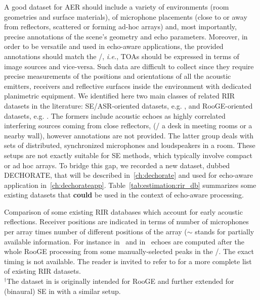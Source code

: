 \mynewline
A good dataset for \ac{AER} should include a variety of environments (room geometries and surface materials), of microphone placements (close to or away from reflectors, scattered or forming ad-hoc arrays) and, most importantly, precise annotations of the scene's geometry and echo parameters.
Moreover, in order to be versatile and used in echo-aware applications, the provided annotations should match the \ISM/, \textit{i.e.}, TOAs should be expressed in terms of image sources and vice-versa.
Such data are difficult to collect since they require precise measurements of the positions and orientations of all the acoustic emitters, receivers and reflective surfaces inside the environment with dedicated planimetric equipment.
We identified here two main classes of related \ac{RIR} datasets in the literature:
\ac{SE}/\ac{ASR}-oriented datasets, e.g. , and \ac{RooGE}-oriented datasets, e.g. .
The formers include acoustic echoes as highly correlated interfering sources coming from close reflectors, (\eg/ a desk in meeting rooms or a nearby wall), however annotations are not provided.
The latter group deals with sets of distributed, synchronized microphones and loudspeakers in a room.
These setups are not exactly suitable for \ac{SE} methods, which typically involve compact or ad hoc arrays.
To bridge this gap, we recorded a new dataset, dubbed \ac{DECHORATE}, that will be described in~\cref{ch:dechorate} and used for echo-aware application in~\cref{ch:dechorateapp}.
Table~\ref{tab:estimation:rir_db} summarizes some existing datasets that \textbf{could} be used in the context of echo-aware processing.

\begin{table}[t]

    \begin{fullwidth}
        \centering
        \footnotesize

        

        \caption{Comparison of some existing \ac{RIR} databases which account for early acoustic reflections.
        Receiver positions are indicated in terms of number of microphones per array times number of different positions of the array ($\sim$ stands for partially available information.
        For instance in~ and in~ echoes are computed after the whole \ac{RooGE} processing from some manually-selected peaks in the \RIRs/.
        The exact timing is not available.
        The reader is invited to refer to  for a more complete list of existing \ac{RIR} datasets.
        \protect\\$^{\dagger}$The dataset in  is originally intended for \ac{RooGE} and further extended for (binaural) \ac{SE} in  with a similar setup.
        }
        \label{tab:estimation:rir_db}
    \end{fullwidth}


\end{table}

